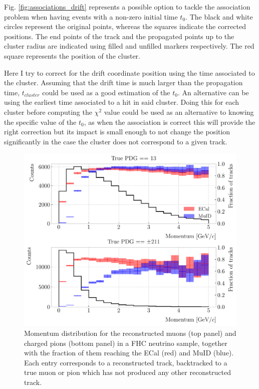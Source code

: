 Fig. \ref{fig:associations_drift} represents a possible option to tackle the association problem when having events with a non-zero initial time $t_{0}$. The black and white circles represent the original points, whereas the squares indicate the corrected positions. The end points of the track and the propagated points up to the cluster radius are indicated using filled and unfilled markers respectively. The red square represents the position of the cluster.

Here I try to correct for the drift coordinate position using the time associated to the cluster. Assuming that the drift time is much larger than the propagation time, $t_{cluster}$ could be used as a good estimation of the $t_{0}$. An alternative can be using the earliest time associated to a hit in said cluster. Doing this for each cluster before computing the $\chi^{2}$ value could be used as an alternative to knowing the specific value of the $t_{0}$, as when the association is correct this will provide the right correction but its impact is small enough to not change the position significantly in the case the cluster does not correspond to a given track.

\begin{figure}[t]
	\centering
	\includegraphics[width=.80\linewidth]{Images/GArSoft_PID/BDT/fraction_vs_preco_no_duplicates.pdf}
	\caption{Momentum distribution for the reconstructed muons (top panel) and charged pions (bottom panel) in a FHC neutrino sample, together with the fraction of them reaching the ECal (red) and MuID (blue). Each entry corresponds to a reconstructed track, backtracked to a true muon or pion which has not produced any other reconstructed track.}
	\label{fig:fraction_particles_ecal_muid}
\end{figure}

